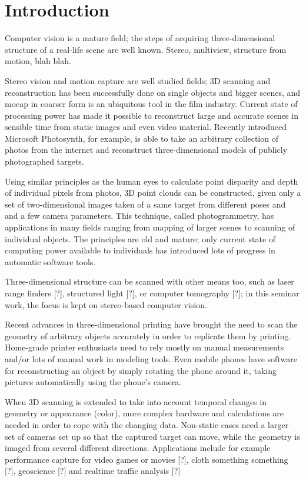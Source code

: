 \section{Introduction}
\thispagestyle{empty}

Computer vision is a mature field; the steps of acquiring three-dimensional structure of a real-life scene are well known.
Stereo, multiview, structure from motion, blah blah.

Stereo vision and motion capture are well studied fields; 3D scanning and reconstruction has been successfully done on single objects and bigger scenes, and mocap in coarser form is an ubiquitous tool in the film industry.
Current state of processing power has made it possible to reconstruct large and accurate scenes in sensible time from static images and even video material.
Recently introduced Microsoft Photosynth, for example, is able to take an arbitrary collection of photos from the internet and reconstruct three-dimensional models of publicly photographed targets.

Using similar principles as the human eyes to calculate point disparity and depth of individual pixels from photos, 3D point clouds can be constructed, given only a set of two-dimensional images taken of a same target from different poses and and a few camera parameters.
This technique, called photogrammetry, has applications in many fields ranging from mapping of larger scenes to scanning of individual objects.
The principles are old and mature; only current state of computing power available to individuals has introduced lots of progress in automatic software tools.

Three-dimensional structure can be scanned with other means too, such as laser range finders [?], structured light [?], or computer tomography [?]; in this seminar work, the focus is kept on stereo-based computer vision.

Recent advances in three-dimensional printing have brought the need to scan the geometry of arbitrary objects accurately in order to replicate them by printing.
Home-grade printer enthusiasts need to rely mostly on manual measurements and/or lots of manual work in modeling tools.
Even mobile phones have software for reconstructing an object by simply rotating the phone around it, taking pictures automatically using the phone's camera.

When 3D scanning is extended to take into account temporal changes in geometry or appearance (color), more complex hardware and calculations are needed in order to cope with the changing data.
Non-static cases need a larger set of cameras set up so that the captured target can move, while the geometry is imaged from several different directions. Applications include for example performance capture for video games or movies [?], cloth something something [?], geoscience [?] and realtime traffic analysis [?]

